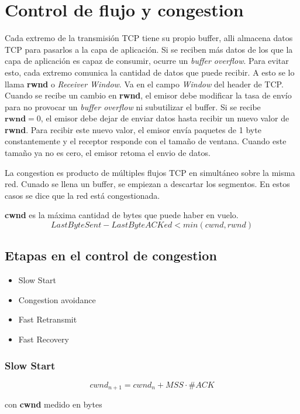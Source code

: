 \documentclass[titlepage,a4paper]{article}
\begin{document}
\section{Control de flujo y congestion}

Cada extremo de la transmisión TCP tiene su propio buffer, alli almacena datos TCP para pasarlos a la capa de aplicación. Si se reciben más datos de los que la capa de aplicación es capaz de consumir, ocurre un \textit{buffer overflow}. Para evitar esto, cada extremo comunica la cantidad de datos que puede recibir. A esto se lo llama \textbf{rwnd} o \textit{Receiver Window}. Va en el campo \textit{Window} del header de TCP.
Cuando se recibe un cambio en \textbf{rwnd}, el emisor debe modificar la tasa de envío para no provocar un \textit{buffer overflow} ni subutilizar el buffer. 
Si se recibe $\textbf{rwnd} = 0 $, el emisor debe dejar de enviar datos hasta recibir un nuevo valor de \textbf{rwnd}. Para recibir este nuevo valor, el emisor envía paquetes de 1 byte constantemente y el receptor responde con el tamaño de ventana. Cuando este tamaño ya no es cero, el emisor retoma el envio de datos.

La congestion es producto de múltiples flujos TCP en simultáneo sobre la misma red. Cunado se llena un buffer, se empiezan a descartar los segmentos. En estos casos se dice que la red está congestionada.

\textbf{cwnd} es la máxima cantidad de bytes que puede haber en vuelo.
$$ LastByteSent-LastByteACKed < min(cwnd,rwnd) $$


\subsection{Etapas en el control de congestion}

\begin{itemize}
    \item Slow Start
    \item Congestion avoidance
    \item Fast Retransmit
    \item Fast Recovery
\end{itemize}

\subsubsection{Slow Start}

$$cwnd_{n+1} = cwnd_n + MSS \cdot \#ACK $$

con \textbf{cwnd} medido en bytes
\end{document}
